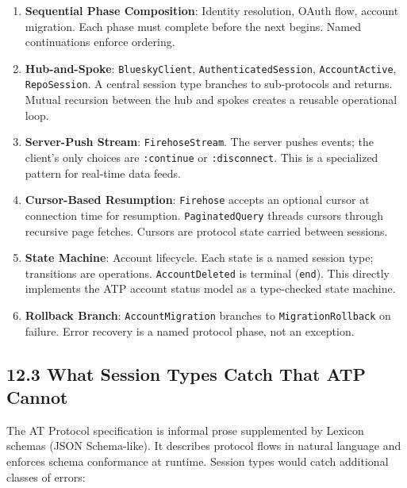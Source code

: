 \documentclass[11pt]{article}
\begin{document}
\begin{enumerate}
\item \textbf{Sequential Phase Composition}: Identity resolution, OAuth flow,
account migration. Each phase must complete before the next begins.
Named continuations enforce ordering.

\item \textbf{Hub-and-Spoke}: \texttt{BlueskyClient}, \texttt{AuthenticatedSession},
\texttt{AccountActive}, \texttt{RepoSession}. A central session type branches to
sub-protocols and returns. Mutual recursion between the hub and spokes
creates a reusable operational loop.

\item \textbf{Server-Push Stream}: \texttt{FirehoseStream}. The server pushes events; the
client's only choices are \texttt{:continue} or \texttt{:disconnect}. This is a
specialized pattern for real-time data feeds.

\item \textbf{Cursor-Based Resumption}: \texttt{Firehose} accepts an optional cursor at
connection time for resumption. \texttt{PaginatedQuery} threads cursors through
recursive page fetches. Cursors are protocol state carried between
sessions.

\item \textbf{State Machine}: Account lifecycle. Each state is a named session type;
transitions are operations. \texttt{AccountDeleted} is terminal (\texttt{end}). This
directly implements the ATP account status model as a type-checked state
machine.

\item \textbf{Rollback Branch}: \texttt{AccountMigration} branches to \texttt{MigrationRollback}
on failure. Error recovery is a named protocol phase, not an exception.
\end{enumerate}
\subsection{12.3 What Session Types Catch That ATP Cannot}
\label{sec:org74b983e}

The AT Protocol specification is informal prose supplemented by Lexicon
schemas (JSON Schema-like). It describes protocol flows in natural language
and enforces schema conformance at runtime. Session types would catch
additional classes of errors:
\end{document}
